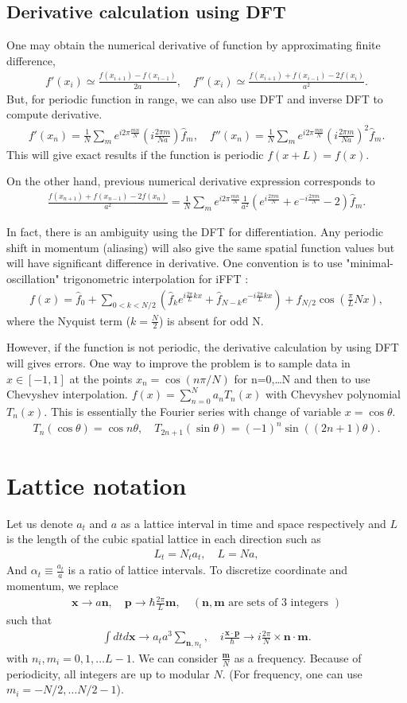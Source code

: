 \documentclass[10pt]{book}
\def\bm{\boldsymbol}
\newcommand{\bea}{\begin{eqnarray}}
\newcommand{\eea}{\end{eqnarray}}
\def\vm{{\bm m}}
\def\vn{{\bm n}}
\def\vp{{\bm p}}
\def\vx{{\bm x}}
\begin{document}
\subsection{Derivative calculation using DFT} 
One may obtain the numerical derivative of function by approximating finite difference,
\bea 
f'(x_i)\simeq \frac{f(x_{i+1})-f(x_{i-1})}{2 a},\quad 
f''(x_i)\simeq \frac{f(x_{i+1})+f(x_{i-1})-2f(x_i)}{a^2}.
\eea  
But, for periodic function in range, we can also use DFT 
and inverse DFT to compute derivative.
\bea 
f'(x_n)=\frac{1}{N}\sum_{m} e^{i2\pi\frac{mn}{N}} (i \frac{2\pi m}{N a})  \hat{f}_m,\quad 
f''(x_n)=\frac{1}{N}\sum_{m} e^{i2\pi\frac{mn}{N}}(i \frac{2\pi m}{N a})^2\hat{f}_m.
\eea 
This will give exact results if the function is periodic $f(x+L)=f(x)$.

On the other hand, previous numerical derivative expression corresponds to 
\bea 
\frac{f(x_{n+1})+f(x_{n-1})-2f(x_n)}{a^2}
= \frac{1}{N}\sum_{m} e^{i2\pi\frac{mn}{N}} 
  \frac{1}{a^2}\left(e^{i\frac{2\pi m}{N} }+e^{-i\frac{2\pi m}{N} }-2\right) 
  \hat{f}_m.
\eea 


In fact, there is an ambiguity using the DFT for differentiation.
Any periodic shift in momentum (aliasing) will also give the same spatial
function values but will have significant difference in derivative. 
One convention is to use "minimal-oscillation" trigonometric interpolation
for iFFT :
\bea 
f(x)=\hat{f}_0+\sum_{0<k<N/2}\left( \hat{f}_{k}e^{i\frac{2\pi}{L} k x}
   +\hat{f}_{N-k}e^{-i\frac{2\pi}{L} k x} \right) 
   +\hat{f}_{N/2}\cos(\frac{\pi}{L} N x),
\eea 
where the Nyquist term ($k=\frac{N}{2}$) is absent for odd N. 

However, if the function is not periodic, the derivative calculation 
by using DFT will gives errors. 
One way to improve the problem is to sample data in $x\in [-1,1]$
at the points $x_n=\cos(n\pi/N)$ for n=0,\dots N and then to use 
Chevyshev interpolation. $f(x)=\sum_{n=0}^{N} a_n T_{n}(x)$ 
with Chevyshev polynomial $T_{n}(x)$. This is essentially the Fourier series
with change of variable $x=\cos\theta$.
\bea 
T_n(\cos\theta)=\cos n\theta,\quad T_{2n+1}(\sin\theta)=(-1)^n\sin((2n+1)\theta).
\eea 

\section{Lattice notation}
Let us denote $a_t$ and $a$ as a lattice interval in time and space respectively and
$L$ is the length of the cubic spatial lattice in each direction
such as
\bea 
L_t=N_t a_t,\quad L=N a,
\eea 
And $\alpha_t\equiv \frac{a_t}{a}$ is a ratio of lattice intervals. 
To discretize coordinate and momentum, we replace
\bea 
\vx \to a \vn ,\quad  \vp \to \hbar \frac{2\pi}{L}\vm ,\quad (\vn,\vm \mbox{ are sets of 3 integers })
\eea 
such that
\bea 
\int dt d\vx \to a_t a^3 \sum_{\vn,n_t}, \quad 
i\frac{\vx\cdot\vp}{\hbar} \to i \frac{2\pi}{N}\times\vn\cdot \vm .
\eea 
with $n_i,m_i=0,1,\dots L-1$. We can consider $\frac{{\bm m}}{N}$ as a frequency.
Because of periodicity, all integers are up to modular $N$. 
(For frequency, one can use $m_i=-N/2,\dots N/2-1$).
\end{document}
